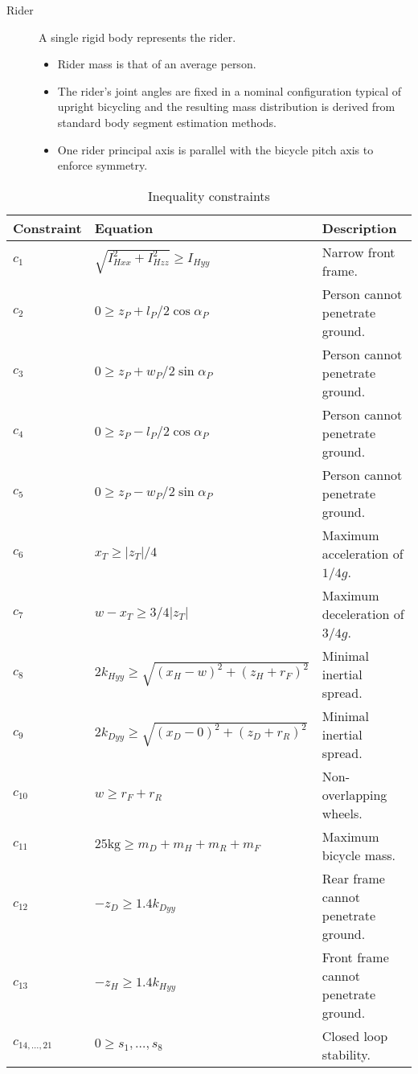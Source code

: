 \documentclass{bmd2019a}
\begin{document}
\begin{description}
  \item[Rider] A single rigid body represents the rider.
    \begin{itemize}
      \itemsep0em
      \item Rider mass is that of an average person.
      \item The rider's joint angles are fixed in a nominal configuration
        typical of upright bicycling and the resulting mass distribution is
        derived from standard body segment estimation methods.
      \item One rider principal axis is parallel with the bicycle pitch axis to
        enforce symmetry.
    \end{itemize}

\end{description}

\begin{table}
  \caption{Inequality constraints}
  \begin{tabular}{lll}
    \toprule
    Constraint & Equation & Description \\
    \midrule
    $c_1$    & $\sqrt{I_{Hxx}^2+I_{Hzz}^2} \geq I_{Hyy}$           & Narrow front frame. \\
    $c_2$    & $0 \geq z_P + l_P/2 \cos{\alpha_P}$                 & Person cannot penetrate ground. \\
    $c_3$    & $0 \geq z_P + w_P/2 \sin{\alpha_P}$                 & Person cannot penetrate ground. \\
    $c_4$    & $0 \geq z_P - l_P/2 \cos{\alpha_P}$                 & Person cannot penetrate ground. \\
    $c_5$    & $0 \geq z_P - w_P/2 \sin{\alpha_P}$                 & Person cannot penetrate ground. \\
    $c_6$    & $x_T \geq |z_T|/4$                                  & Maximum acceleration of $1/4g$. \\
    $c_7$    & $w-x_T \geq 3/4|z_T|$                               & Maximum deceleration of $3/4g$. \\
    $c_8$    & $2k_{Hyy} \geq \sqrt{(x_H - w)^2 + (z_H + r_F)^2}$  & Minimal inertial spread. \\
    $c_9$    & $2k_{Dyy} \geq \sqrt{(x_D - 0)^2 + (z_D + r_R)^2}$  & Minimal inertial spread. \\
    $c_{10}$ & $w \geq r_F +r_R$                                   & Non-overlapping wheels. \\
    $c_{11}$ & $25\si{\kg} \geq m_D + m_H + m_R + m_F$             & Maximum bicycle mass. \\
    $c_{12}$ & $-z_D \geq 1.4 k_{Dyy}$                             & Rear frame cannot penetrate ground. \\
    $c_{13}$ & $-z_H \geq 1.4 k_{Hyy}$                             & Front frame cannot penetrate ground. \\
    $c_{14,\ldots,21}$ & $0 \geq s_1,\ldots,s_8$                   & Closed loop stability. \\
    \bottomrule
  \end{tabular}
\end{table}
\end{document}

